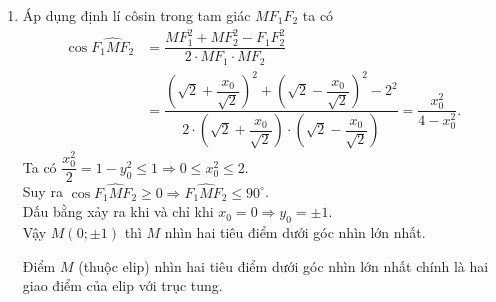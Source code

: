 \begin{bt}
{\begin{enumerate}
$$			$$
			Mặt khác do $M$ thuộc $(E)$ nên ta có
			$$
			\dfrac{x_{0}^{2}}{2}+\dfrac{y_{0}^{2}}{1}=1 \Leftrightarrow y_{0}^{2}=1-\dfrac{x_{0}^{2}}{2}=1-\dfrac{\left(-\dfrac{2}{3}\right)^{2}}{2}=\dfrac{7}{9} \Leftrightarrow\left[\begin{aligned}
				y_{0}=\dfrac{\sqrt{7}}{3} \\
				y_{0}=-\dfrac{\sqrt{7}}{3} .
			\end{aligned}\right.
			$$
			Vậy $M\left(-\dfrac{2}{3} ; \dfrac{\sqrt{7}}{3}\right)$ hoặc $M\left(-\dfrac{2}{3} ;-\dfrac{\sqrt{7}}{3}\right)$.
			\item Áp dụng định lí côsin trong tam giác $M F_{1} F_{2}$ ta có
			$$
			\begin{aligned}
				\cos \widehat{{F}_{1} M F_{2}} &=\dfrac{M F_{1}^{2}+M F_{2}^{2}-F_{1} F_{2}^{2}}{2 \cdot M F_{1} \cdot M F_{2}} \\
				&=\dfrac{\left(\sqrt{2}+\dfrac{x_{0}}{\sqrt{2}}\right)^{2}+\left(\sqrt{2}-\dfrac{x_{0}}{\sqrt{2}}\right)^{2}-2^{2}}{2 \cdot\left(\sqrt{2}+\dfrac{x_{0}}{\sqrt{2}}\right) \cdot\left(\sqrt{2}-\dfrac{x_{0}}{\sqrt{2}}\right)}=\dfrac{x_{0}^{2}}{4-x_{0}^{2}} .
			\end{aligned}
			$$
			Ta có $\dfrac{x_{0}^{2}}{2}=1-y_{0}^{2} \leq 1 \Rightarrow 0 \leq x_{0}^{2} \leq 2$.\\
			Suy ra $\cos \widehat{F_{1} M F_{2}} \geq 0 \Rightarrow \widehat{F_{1} M F_{2}} \leq 90^{\circ}$.\\
			Dấu bằng xảy ra khi và chỉ khi $x_{0}=0 \Rightarrow y_{0}=\pm 1$.\\
			Vậy $M(0 ; \pm 1)$ thì $M$ nhìn hai tiêu điểm dưới góc nhìn lớn nhất.
			\begin{note}
				Điểm $M$ (thuộc elip) nhìn hai tiêu điểm dưới góc nhìn lớn nhất chính là hai giao điểm của elip với trục tung.
			\end{note}
		\end{enumerate}
	}
\end{bt}

